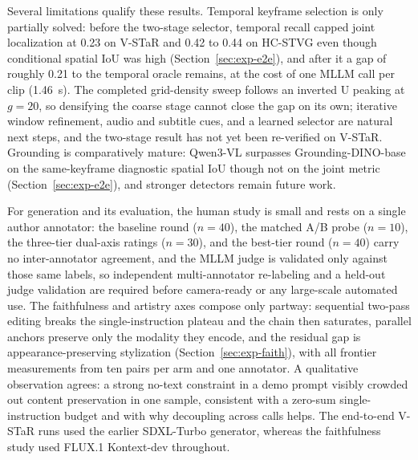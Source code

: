 \documentclass[10pt]{article}
\begin{document}
Several limitations qualify these results. Temporal keyframe selection is only partially solved: before the two-stage selector, temporal recall capped joint localization at 0.23 on V-STaR and 0.42 to 0.44 on HC-STVG even though conditional spatial IoU was high (Section~\ref{sec:exp-e2e}), and after it a gap of roughly 0.21 to the temporal oracle remains, at the cost of one MLLM call per clip (1.46~s). The completed grid-density sweep follows an inverted U peaking at $g=20$, so densifying the coarse stage cannot close the gap on its own; iterative window refinement, audio and subtitle cues, and a learned selector are natural next steps, and the two-stage result has not yet been re-verified on V-STaR. Grounding is comparatively mature: Qwen3-VL surpasses Grounding-DINO-base on the same-keyframe diagnostic spatial IoU though not on the joint metric (Section~\ref{sec:exp-e2e}), and stronger detectors remain future work.

For generation and its evaluation, the human study is small and rests on a single author annotator: the baseline round ($n=40$), the matched A/B probe ($n=10$), the three-tier dual-axis ratings ($n=30$), and the best-tier round ($n=40$) carry no inter-annotator agreement, and the MLLM judge is validated only against those same labels, so independent multi-annotator re-labeling and a held-out judge validation are required before camera-ready or any large-scale automated use. The faithfulness and artistry axes compose only partway: sequential two-pass editing breaks the single-instruction plateau and the chain then saturates, parallel anchors preserve only the modality they encode, and the residual gap is appearance-preserving stylization (Section~\ref{sec:exp-faith}), with all frontier measurements from ten pairs per arm and one annotator. A qualitative observation agrees: a strong no-text constraint in a demo prompt visibly crowded out content preservation in one sample, consistent with a zero-sum single-instruction budget and with why decoupling across calls helps. The end-to-end V-STaR runs used the earlier SDXL-Turbo generator, whereas the faithfulness study used FLUX.1 Kontext-dev throughout.
\end{document}
